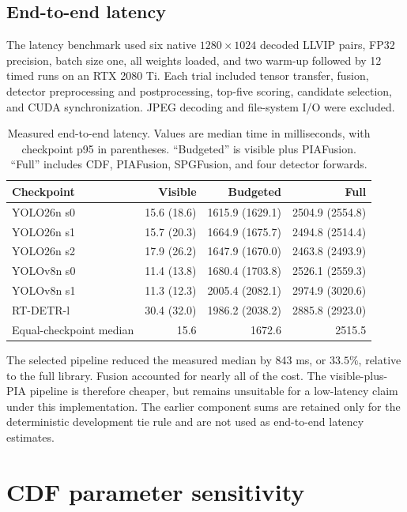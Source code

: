 \documentclass[11pt]{article}
\begin{document}
\subsection{End-to-end latency}

The latency benchmark used six native \(1280\times1024\) decoded LLVIP pairs,
FP32 precision, batch size one, all weights loaded, and two warm-up followed
by 12 timed runs on an RTX 2080 Ti. Each trial included tensor transfer,
fusion, detector preprocessing and postprocessing, top-five scoring, candidate
selection, and CUDA synchronization. JPEG decoding and file-system I/O were
excluded.

\begin{table}[ht]
\centering
\small
\setlength{\tabcolsep}{3pt}
\caption{Measured end-to-end latency. Values are median time in milliseconds,
with checkpoint p95 in parentheses. ``Budgeted'' is visible plus PIAFusion.
``Full'' includes CDF, PIAFusion, SPGFusion, and four detector forwards.}
\label{tab:pia-latency}
\begin{tabular}{@{}lrrr@{}}
\toprule
Checkpoint & Visible & Budgeted & Full \\
\midrule
YOLO26n s0 & 15.6 (18.6) & 1615.9 (1629.1) & 2504.9 (2554.8) \\
YOLO26n s1 & 15.7 (20.3) & 1664.9 (1675.7) & 2494.8 (2514.4) \\
YOLO26n s2 & 17.9 (26.2) & 1647.9 (1670.0) & 2463.8 (2493.9) \\
YOLOv8n s0 & 11.4 (13.8) & 1680.4 (1703.8) & 2526.1 (2559.3) \\
YOLOv8n s1 & 11.3 (12.3) & 2005.4 (2082.1) & 2974.9 (3020.6) \\
RT-DETR-l & 30.4 (32.0) & 1986.2 (2038.2) & 2885.8 (2923.0) \\
\midrule
Equal-checkpoint median & 15.6 & 1672.6 & 2515.5 \\
\bottomrule
\end{tabular}
\end{table}

The selected pipeline reduced the measured median by 843 ms, or \(33.5\%\),
relative to the full library. Fusion accounted for nearly all of the cost.
The visible-plus-PIA pipeline is therefore cheaper, but remains unsuitable
for a low-latency claim under this implementation. The earlier component sums
are retained only for the deterministic development tie rule and are not used
as end-to-end latency estimates.

\section{CDF parameter sensitivity}
\end{document}

